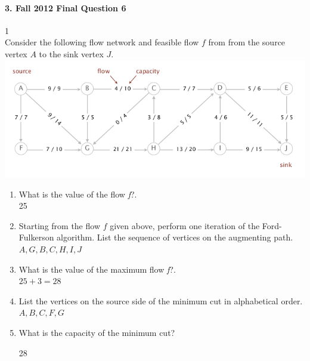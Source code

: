 \documentclass{article}
\begin{document}
\paragraph{\Large 3. Fall 2012 Final Question 6}1\mbox{}\\
Consider the following flow network and feasible flow $f$ from from the source vertex $A$ to the sink vertex $J$.\\
\includegraphics[width=\linewidth]{fin-f12-6.png}
\begin{enumerate}
\renewcommand{\theenumi}{\Alph{enumi}}
	\item What is the value of the flow \textit{f}?.\\
	
	25

	\item Starting from the flow $f$ given above, perform one iteration of the Ford-Fulkerson algorithm. List the sequence of vertices on the augmenting path.\\

	$A, G, B, C, H, I, J$

	\item What is the value of the maximum flow \textit{f}?.\\
	
	$25+3=28$

	\item List the vertices on the source side of the minimum cut in alphabetical order.\\

	$A, B, C, F, G$

	\item What is the capacity of the minimum cut?

	28

\end{enumerate}
\end{document}
